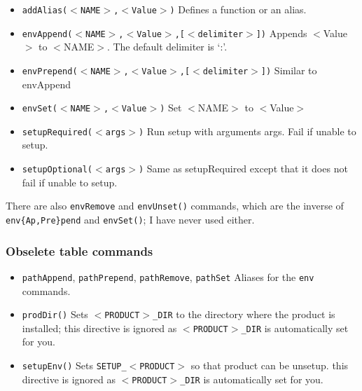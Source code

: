 \documentclass{article}
\begin{document}
\begin{itemize}
   \item \texttt{addAlias($<$NAME$>$,$<$Value$>$)}
     Defines a function or an alias.
    
   \item \texttt{envAppend($<$NAME$>$,$<$Value$>$,[$<$delimiter$>$])}
     Appends $<$Value$>$ to $<$NAME$>$. The default delimiter is `:'.
     
   \item \texttt{envPrepend($<$NAME$>$,$<$Value$>$,[$<$delimiter$>$])}
     Similar to envAppend
     
   \item \texttt{envSet($<$NAME$>$,$<$Value$>$)}
     Set $<$NAME$>$ to $<$Value$>$
     
   \item \texttt{setupRequired($<$args$>$)}
     Run setup with arguments args. Fail if unable to setup.
     
   \item \texttt{setupOptional($<$args$>$)}
     Same as setupRequired except that it does not fail if unable to setup.
\end{itemize}

There are also \texttt{envRemove} and \texttt{envUnset()} commands, which
are the inverse of \texttt{env\{Ap,Pre\}pend} and \texttt{envSet()}; I have
never used either.     

\subsubsection{Obselete table commands}

\begin{itemize}
   \item \texttt{pathAppend}, \texttt{pathPrepend}, \texttt{pathRemove}, \texttt{pathSet}
     Aliases for the \texttt{env} commands.
     
   \item \texttt{prodDir()}
     Sets \texttt{$<$PRODUCT$>$\_DIR} to the directory where the product is installed;
     this directive is ignored as \texttt{$<$PRODUCT$>$\_DIR} is automatically set for you.
     
   \item \texttt{setupEnv()}
     Sets \texttt{SETUP\_$<$PRODUCT$>$} so that product can be unsetup.
     this directive is ignored as \texttt{$<$PRODUCT$>$\_DIR} is automatically set for you.
\end{itemize}
        
\end{document}
